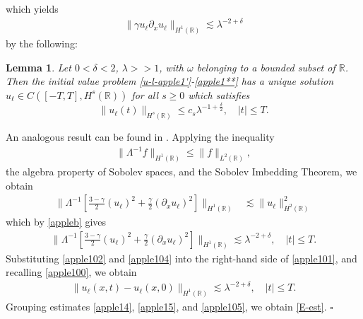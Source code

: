 \documentclass[12pt,reqno]{amsart}
\renewcommand{\qedsymbol}{\ensuremath{\square}}
\newcommand{\rr}{\mathbb{R}}
\newcommand{\p}{\partial}
\theoremstyle{plain}  %
\newtheorem{lemma}{Lemma}
\theoremstyle{definition}
\begin{document}
%
%
which yields 
%
%
\begin{equation}
\begin{split}
\|\gamma u_\ell \p_x u_\ell \|_{H^1(\rr)} \lesssim \lambda^{-2 + \delta}
\label{apple102}
\end{split}
\end{equation}
%
%
%
%
by the following:
%
%
%
%
%
% 				
%
%
%
%
%
\begin{lemma}
\label{appleb}
Let $0<\delta<2$, $\lambda >>1$, with $\omega$ belonging to a bounded
subset of $\rr$. Then the initial value problem
\eqref{u-l-apple1'}-\eqref{apple1**}
has a unique solution
$u_\ell \in C( [-T,T], H^s(\rr))$ for all $s
\ge 0$ which satisfies
%
%
\begin{equation}
\label{apple10'}
\|u_\ell(t)\|_{H^s(\rr)} \le c_s \lambda^{-1 +
\frac{\delta}{2}}, \quad |t| \le T.
\end{equation}
%
%
\end{lemma}
%
An analogous result can be found in \cite{Himonas_2009_Non-uniform-dep}. %
%
%
%
Applying the inequality %
%
\begin{equation*}
\begin{split}
\|\Lambda^{-1} f \|_{H^1(\rr)} \le \|f\|_{L^2(\rr)},
\label{apple27}
\end{split}
\end{equation*}
%
%
the algebra property of Sobolev spaces, and
the Sobolev Imbedding Theorem, we obtain
%
%
\begin{equation*}
\begin{split}
\|\Lambda^{-1} \left[ \frac{3-\gamma}{2}(u_\ell)^2 +
\frac{\gamma}{2}\left( \p_x u_\ell \right)^2 \right] \|_{H^1(\rr)}
& \lesssim \|u_\ell\|_{H^2(\rr)}^2
\end{split}
\end{equation*}
%
%
which by \autoref{appleb} gives
%
%
\begin{equation}
\begin{split}
\|\Lambda^{-1} \left[ \frac{3-\gamma}{2}(u_\ell)^2 +
\frac{\gamma}{2}\left( \p_x u_\ell \right)^2 \right] \|_{H^1(\rr)}
\lesssim \lambda^{-2 + \delta}, \quad |t| \le T.
\label{apple104}
\end{split}
\end{equation}
%
%
Substituting \eqref{apple102} and \eqref{apple104} into the right-hand side 
of
\eqref{apple101}, and recalling \eqref{apple100}, we obtain
%
%
\begin{equation}
\begin{split}
\|u_\ell(x,t) - u_\ell(x,0)\|_{H^1(\rr)} \lesssim \lambda^{-2 + \delta}, 
\quad |t| \le T.
\label{apple105}
\end{split}
\end{equation}
%
%
Grouping estimates \eqref{apple14}, \eqref{apple15}, and \eqref{apple105}, 
we obtain \eqref{E-est}. \qquad \qedsymbol
%
%
%
%
\end{document}
